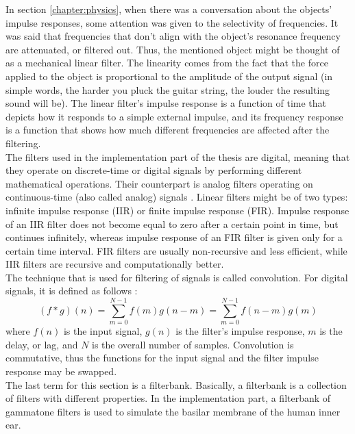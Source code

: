 In section \ref{chapter:physics}, when there was a conversation about the objects' impulse responses, some attention was given to the selectivity of frequencies. It was said that frequencies that don't align with the object's resonance frequency are attenuated, or filtered out. Thus, the mentioned object might be thought of as a mechanical linear filter. The linearity comes from the fact that the force applied to the object is proportional to the amplitude of the output signal (in simple words, the harder you pluck the guitar string, the louder the resulting sound will be). The linear filter's impulse response is a function of time that depicts how it responds to a simple external impulse, and its frequency response is a function that shows how much different frequencies are affected after the filtering.\\

The filters used in the implementation part of the thesis are digital, meaning that they ope\-rate on discrete-time or digital signals by performing different mathematical operations. Their counterpart is analog filters operating on continuous-time (also called analog) signals \cite{Shenoi2005}. Linear filters might be of two types: infinite impulse response (IIR) or finite impulse response (FIR). Impulse response of an IIR filter does not become equal to zero after a certain point in time, but continues infinitely, whereas impulse response of an FIR filter is given only for a certain time interval. FIR filters are usually non-recursive and less efficient, while IIR filters are recursive and computationally better.\\

The technique that is used for filtering of signals is called convolution. For digital signals, it is defined as follows \cite{Schnupp2011}:
\begin{equation}
	(f*g)(n) = \sum_{m=0}^{N-1}f(m)g(n - m) = \sum_{m=0}^{N-1}f(n - m)g(m)
\end{equation}
where $f(n)$ is the input signal, $g(n)$ is the filter's impulse response, $m$ is the delay, or lag, and $N$ is the overall number of samples. Convolution is commutative, thus the functions for the input signal and the filter impulse response may be swapped.\\

The last term for this section is a filterbank. Basically, a filterbank is a collection of filters with different properties. In the implementation part, a filterbank of gammatone filters is used to simulate the basilar membrane of the human inner ear.

